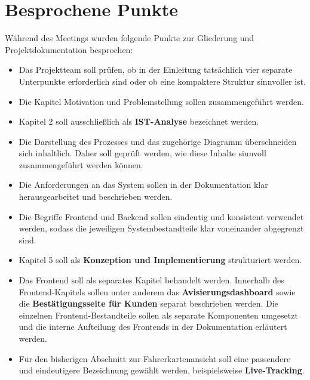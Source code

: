 \documentclass[a4paper,11pt]{article}
\begin{document}
\vspace{0.5cm}

\section{Besprochene Punkte}

Während des Meetings wurden folgende Punkte zur Gliederung und
Projektdokumentation besprochen:

\begin{itemize}[leftmargin=1.2cm]

\item Das Projektteam soll prüfen, ob in der Einleitung tatsächlich vier
separate Unterpunkte erforderlich sind oder ob eine kompaktere Struktur
sinnvoller ist.

\item Die Kapitel Motivation und Problemstellung sollen
zusammengeführt werden.

\item Kapitel 2 soll ausschließlich als \textbf{IST-Analyse} bezeichnet
werden.

\item Die Darstellung des Prozesses und das zugehörige Diagramm
überschneiden sich inhaltlich. Daher soll geprüft werden, wie diese Inhalte
sinnvoll zusammengeführt werden können.

\item Die Anforderungen an das System sollen in der Dokumentation
klar herausgearbeitet und beschrieben werden.

\item Die Begriffe Frontend und Backend sollen eindeutig
und konsistent verwendet werden, sodass die jeweiligen Systembestandteile
klar voneinander abgegrenzt sind.

\item Kapitel 5 soll als \textbf{Konzeption und Implementierung} strukturiert
werden.

\item Das Frontend soll als separates Kapitel behandelt werden. Innerhalb des
Frontend-Kapitels sollen unter anderem das \textbf{Avisierungsdashboard}
sowie die \textbf{Bestätigungsseite für Kunden} separat beschrieben werden.
Die einzelnen Frontend-Bestandteile sollen als separate Komponenten
umgesetzt und die interne Aufteilung des Frontends in der Dokumentation
erläutert werden.

\item Für den bisherigen Abschnitt zur Fahrerkartenansicht soll eine passendere
und eindeutigere Bezeichnung gewählt werden, beispielsweise
\textbf{Live-Tracking}.


\end{itemize}
\end{document}
